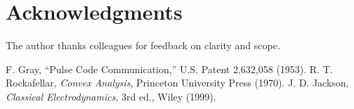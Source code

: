 \documentclass[11pt,letterpaper]{article}
\begin{document}
\section*{Acknowledgments}
The author thanks colleagues for feedback on clarity and scope.

\begin{thebibliography}{9}
 F. Gray, ``Pulse Code Communication,'' U.S. Patent 2,632,058 (1953).
 R. T. Rockafellar, \emph{Convex Analysis}, Princeton University Press (1970).
 J. D. Jackson, \emph{Classical Electrodynamics}, 3rd ed., Wiley (1999).
\end{thebibliography}
\end{document}

